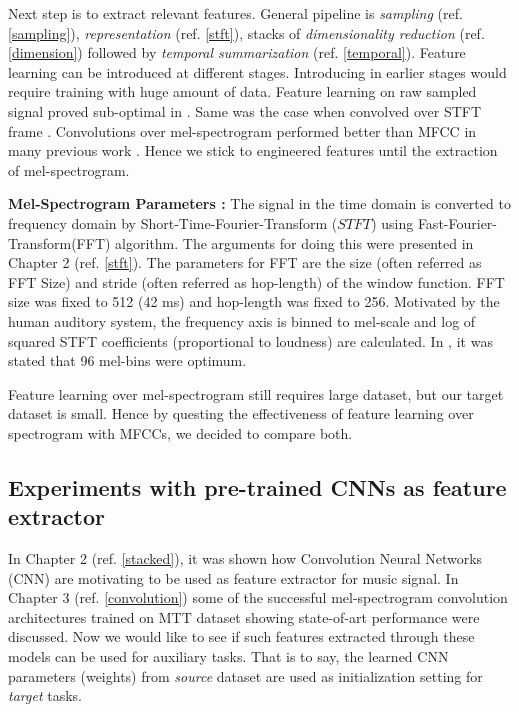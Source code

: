 \noindent Next step is to extract relevant features. General pipeline is \textit{sampling} (ref. \ref{sampling}), \textit{representation} (ref. \ref{stft}), stacks of \textit{dimensionality reduction} (ref. \ref{dimension}) followed by \textit{temporal summarization} (ref. \ref{temporal}). Feature learning can be introduced at different stages. Introducing in earlier stages would require training with huge amount of data. Feature learning on raw sampled signal proved sub-optimal in \cite{EndToEnd}. Same was the case when convolved over STFT frame \cite{choi_cnn}. Convolutions over mel-spectrogram performed better than MFCC in many previous work \cite{choi_cnn}\cite{EndToEnd}. Hence we stick to engineered features until the extraction of mel-spectrogram.  
\bigskip 

\noindent \textbf{Mel-Spectrogram Parameters :}
The signal in the time domain is converted to frequency domain by Short-Time-Fourier-Transform ($STFT$) using Fast-Fourier-Transform(FFT) algorithm. The arguments for doing this were presented in Chapter 2 (ref. \ref{stft}). The parameters for FFT are the size (often referred as FFT Size) and stride (often referred as hop-length) of the window function. FFT size was fixed to 512 (42 ms) and hop-length was fixed to 256. Motivated by the human auditory system, the frequency axis is binned to mel-scale and log of squared STFT coefficients (proportional to loudness) are calculated. In \cite{choi_cnn}, it was stated that 96 mel-bins were optimum.   
\bigskip

\noindent Feature learning over mel-spectrogram still requires large dataset, but our target dataset is small. Hence by questing the effectiveness of feature learning over spectrogram with MFCCs, we decided  to compare both.
\bigskip

\subsection{Experiments with pre-trained CNNs as feature extractor}
\label{pretrained}
In Chapter 2 (ref. \ref{stacked}), it was shown how Convolution Neural Networks (CNN) are motivating to be used as feature extractor for music signal. In Chapter 3 (ref. \ref{convolution}) some of the successful mel-spectrogram convolution architectures trained on MTT dataset showing state-of-art performance were discussed. Now we would like to see if such features extracted through these models can be used for auxiliary tasks. That is to say, the learned CNN parameters (weights) from \textit{source} dataset are used as initialization setting for \textit{target} tasks.    
\bigskip

